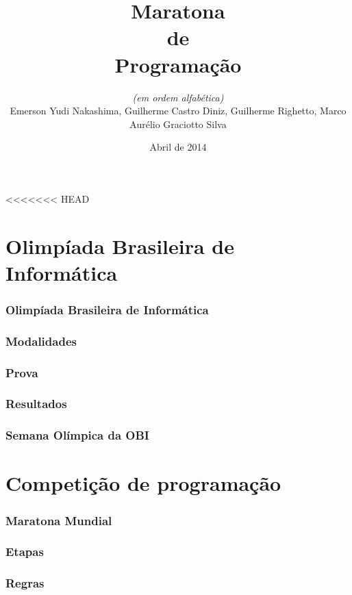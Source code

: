 \documentclass[utf8, usepdftitle=false, svgnames, color={table, fixpdftex, hyperref, fixinclude, xcdraw}, t, brazil]{beamer}
\title{Maratona\\de\\Programação}
\author[UTFPR-CM]{\textit{(em ordem alfabética)}\\Emerson Yudi Nakashima, Guilherme Castro Diniz, Guilherme Righetto, Marco Aurélio Graciotto Silva}
\date[]{Abril de 2014}
\begin{document}
<<<<<<< HEAD
 \frontmatter{}
 

 \part{Olimpíada Brasileira de Informática}
 
 \section{Olimpíada Brasileira de Informática}
 
 
 \section{Modalidades}
 
 
 \section{Prova}
 
 
 \section{Resultados}
 
 
 \section{Semana Olímpica da OBI}
 
 
 \part{Competição de programação}
 
 \section{Maratona Mundial}
 
 
 \section{Etapas}
 
 
 \section{Regras}
 
 
\end{document}
